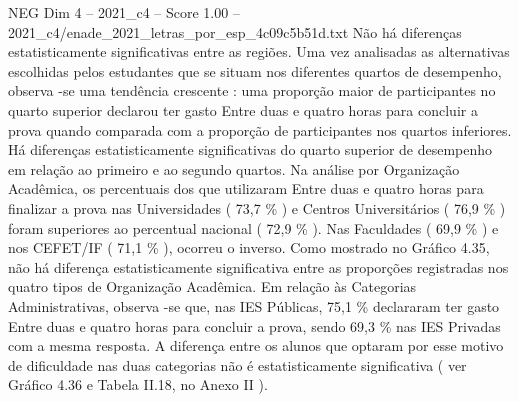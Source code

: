\begin{textsample}{NEG Dim 4 – 2021\_c4 – Score 1.00 – 2021\_c4/enade\_2021\_letras\_por\_esp\_4c09c5b51d.txt}
Não há diferenças estatisticamente significativas entre as regiões.
Uma vez analisadas as alternativas escolhidas pelos estudantes que se situam nos diferentes quartos de desempenho, observa -se uma tendência crescente : uma proporção maior de participantes no quarto superior declarou ter gasto Entre duas e quatro horas para concluir a prova quando comparada com a proporção de participantes nos quartos inferiores.
Há diferenças estatisticamente significativas do quarto superior de desempenho em relação ao primeiro e ao segundo quartos.
Na análise por Organização Acadêmica, os percentuais dos que utilizaram Entre duas e quatro horas para finalizar a prova nas Universidades ( 73,7 \% ) e Centros Universitários ( 76,9 \% ) foram superiores ao percentual nacional ( 72,9 \% ).
Nas Faculdades ( 69,9 \% ) e nos CEFET/IF ( 71,1 \% ), ocorreu o inverso.
Como mostrado no Gráfico 4.35, não há diferença estatisticamente significativa entre as proporções registradas nos quatro tipos de Organização Acadêmica.
Em relação às Categorias Administrativas, observa -se que, nas IES Públicas, 75,1 \% declararam ter gasto Entre duas e quatro horas para concluir a prova, sendo 69,3 \% nas IES Privadas com a mesma resposta.
A diferença entre os alunos que optaram por esse motivo de dificuldade nas duas categorias não é estatisticamente significativa ( ver Gráfico 4.36 e Tabela II.18, no Anexo II ).

\end{textsample}
